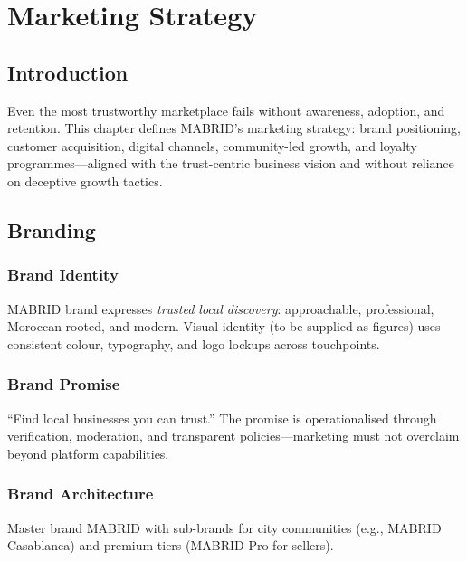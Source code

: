 \chapter{Marketing Strategy}
\label{ch:marketing}

\section{Introduction}

Even the most trustworthy marketplace fails without awareness, adoption, and retention. This chapter defines MABRID's marketing strategy: brand positioning, customer acquisition, digital channels, community-led growth, and loyalty programmes---aligned with the trust-centric business vision and without reliance on deceptive growth tactics.

\section{Branding}

\subsection{Brand Identity}

MABRID brand expresses \emph{trusted local discovery}: approachable, professional, Moroccan-rooted, and modern. Visual identity (to be supplied as figures) uses consistent colour, typography, and logo lockups across touchpoints.


\subsection{Brand Promise}

``Find local businesses you can trust.'' The promise is operationalised through verification, moderation, and transparent policies---marketing must not overclaim beyond platform capabilities.

\subsection{Brand Architecture}

Master brand MABRID with sub-brands for city communities (e.g., MABRID Casablanca) and premium tiers (MABRID Pro for sellers).

